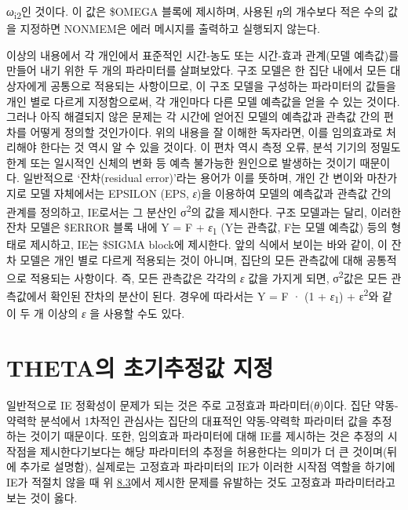 \documentclass[
  10pt,
  krantz2,
  a4paper]{krantz}
\theoremstyle{definition}
\theoremstyle{definition}
\theoremstyle{definition}
\theoremstyle{remark}
\begin{document}
\emph{ω}\textsubscript{i2}인 것이다. 이 값은 \$OMEGA 블록에 제시하며, 사용된 \emph{η}의 개수보다 적은 수의 값을 지정하면 NONMEM은 에러 메시지를 출력하고 실행되지 않는다.

이상의 내용에서 각 개인에서 표준적인 시간-농도 또는 시간-효과 관계(모델 예측값)를 만들어 내기 위한 두 개의 파라미터를 살펴보았다. 구조 모델은 한 집단 내에서 모든 대상자에게 공통으로 적용되는 사항이므로, 이 구조 모델을 구성하는 파라미터의 값들을 개인 별로 다르게 지정함으로써, 각 개인마다 다른 모델 예측값을 얻을 수 있는 것이다. 그러나 아직 해결되지 않은 문제는 각 시간에 얻어진 모델의 예측값과 관측값 간의 편차를 어떻게 정의할 것인가이다. 위의 내용을 잘 이해한 독자라면, 이를 임의효과로 처리해야 한다는 것 역시 알 수 있을 것이다. 이 편차 역시 측정 오류, 분석 기기의 정밀도 한계 또는 일시적인 신체의 변화 등 예측 불가능한 원인으로 발생하는 것이기 때문이다. 일반적으로 `잔차(residual error)'라는 용어가 이를 뜻하며, 개인 간 변이와 마찬가지로 모델 자체에서는 EPSILON (EPS, \emph{ε})을 이용하여 모델의 예측값과 관측값 간의 관계를 정의하고, IE로서는 그 분산인 σ\textsuperscript{2}의 값을 제시한다. 구조 모델과는 달리, 이러한 잔차 모델은 \$ERROR 블록 내에 Y = F + \emph{ε}\textsubscript{1} (Y는 관측값, F는 모델 예측값) 등의 형태로 제시하고, IE는 \$SIGMA block에 제시한다. 앞의 식에서 보이는 바와 같이, 이 잔차 모델은 개인 별로 다르게 적용되는 것이 아니며, 집단의 모든 관측값에 대해 공통적으로 적용되는 사항이다. 즉, 모든 관측값은 각각의 \emph{ε} 값을 가지게 되면, σ\textsuperscript{2}값은 모든 관측값에서 확인된 잔차의 분산이 된다. 경우에 따라서는 Y = F · (1 + \emph{ε}\textsubscript{1}) + ε\textsuperscript{2}와 같이 두 개 이상의 \emph{ε} 을 사용할 수도 있다.

\hypertarget{thetauxc758-uxcd08uxae30uxcd94uxc815uxac12-uxc9c0uxc815}{%
\section{THETA의 초기추정값 지정}\label{thetauxc758-uxcd08uxae30uxcd94uxc815uxac12-uxc9c0uxc815}}

일반적으로 IE 정확성이 문제가 되는 것은 주로 고정효과 파라미터(\emph{θ})이다. 집단 약동-약력학 분석에서 1차적인 관심사는 집단의 대표적인 약동-약력학 파라미터 값을 추정하는 것이기 때문이다. 또한, 임의효과 파라미터에 대해 IE를 제시하는 것은 추정의 시작점을 제시한다기보다는 해당 파라미터의 추정을 허용한다는 의미가 더 큰 것이며(뒤에 추가로 설명함), 실제로는 고정효과 파라미터의 IE가 이러한 시작점 역할을 하기에 IE가 적절치 않을 때 위 \protect\hyperlink{fixed-random-meaning}{8.3}에서 제시한 문제를 유발하는 것도 고정효과 파라미터라고 보는 것이 옳다.
\end{document}
